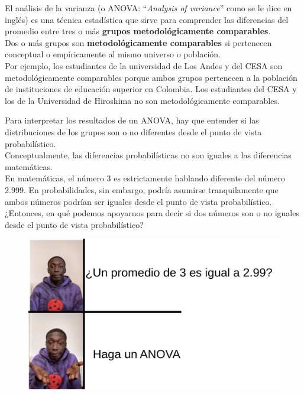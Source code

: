 \documentclass[aspectratio=169]{beamer}
\begin{document}
\begin{frame}
El análisis de la varianza (o ANOVA: ``\textit{Analysis of variance}'' como se le dice en inglés) es una técnica estadística que sirve para comprender las diferencias del promedio entre tres o más \textbf{grupos metodológicamente comparables}.\\
\vspace{0.5cm}
Dos o más grupos son \textbf{metodológicamente comparables} si pertenecen conceptual o empíricamente al mismo universo o población. \\
\vspace{0.5cm}
Por ejemplo, los estudiantes de la universidad de Los Andes y del CESA son metodológicamente comparables porque ambos grupos pertenecen a la población de instituciones de educación superior en Colombia. Los estudiantes del CESA y los de la Universidad de Hiroshima no son metodológicamente comparables.
\end{frame}

\begin{frame}
Para interpretar los resultados de un ANOVA, hay que entender si las distribuciones de los grupos son o no diferentes desde el punto de vista probabilístico.\\
\vspace{0.5cm}
Conceptualmente, las diferencias probabilísticas no son iguales a las diferencias matemáticas.\\
\vspace{0.5cm}
En matemáticas, el número 3 es estrictamente hablando diferente del número 2.999. En probabilidades, sin embargo, podría asumirse tranquilamente que ambos números podrían ser iguales desde el punto de vista probabilístico.\\
\vspace{0.5cm}
¿Entonces, en qué podemos apoyarnos para decir si dos números son o no iguales desde el punto de vista probabilístico?
\end{frame}

\begin{frame}
\begin{figure}
\centering
\includegraphics[width=.75\textwidth]{lame.png}
\end{figure}
\end{frame}
\end{document}
